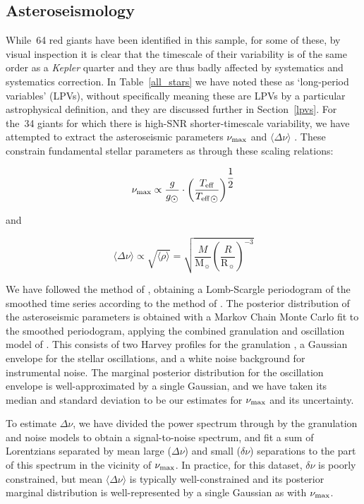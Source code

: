 \documentclass[a4paper,fleqn,usenatbib]{mnras}
\newcommand{\numax}{\mbox{$\nu_{\rm max}$}\xspace}
\newcommand{\Dnu}{\mbox{$\Delta \nu$}\xspace}
\newcommand{\dnu}{\mbox{$\delta \nu$}\xspace}
\newcommand{\teff}{\mbox{$T_{\rm eff}$}\xspace}
\newcommand{\msun}{\mbox{$\mathrm{M}_{\sun}$}\xspace}
\newcommand{\rsun}{\mbox{$\mathrm{R}_{\sun}$}\xspace}
\newcommand{\kepler}{\emph{Kepler}\xspace}
\begin{document}



\subsection{Asteroseismology}
\label{asteroseismology}

While~64 red giants have been identified in this sample, for some of these, by visual inspection it is clear that the timescale of their variability is of the same order as a \kepler quarter and they are thus badly affected by systematics and systematics correction. In Table~\ref{all_stars} we have noted these as `long-period variables' (LPVs), without specifically meaning these are LPVs by a particular astrophysical definition, and they are discussed further in Section~\ref{lpvs}. For the~34 giants for which there is high-SNR shorter-timescale variability, we have attempted to extract the asteroseismic parameters \numax and $\langle \Dnu \rangle$ \citep{KB95,2013ARA&A..51..353C}. These constrain fundamental stellar parameters as through these scaling relations: 

\begin{equation}
\label{scaling}
\numax \propto \dfrac{g}{g_{\sun}} \cdot \left(\dfrac{\teff}{\teff_{\sun}}\right)^{\dfrac{1}{2}}
\end{equation}

and

\begin{equation}
\langle \Dnu \rangle \propto \sqrt{\langle \rho \rangle} = \sqrt{\dfrac{M}{\msun} \left(\dfrac{R}{\rsun}\right)^{-3}}
\end{equation}

We have followed the method of \citet{2016AN....337..774D}, obtaining a Lomb-Scargle periodogram of the smoothed time series according to the method of \citet{2011MNRAS.414L...6G}. The posterior distribution of the asteroseismic parameters is obtained with a Markov Chain Monte Carlo fit to the smoothed periodogram, applying the combined granulation and oscillation model of \citet{2014A&A...570A..41K}. This consists of two Harvey profiles for the granulation \citep{1985ESASP.235..199H}, a Gaussian envelope for the stellar oscillations, and a white noise background for instrumental noise. The marginal posterior distribution for the oscillation envelope is well-approximated by a single Gaussian, and we have taken its median and standard deviation to be our estimates for \numax and its uncertainty.

To estimate \Dnu, we have divided the power spectrum through by the granulation and noise models to obtain a signal-to-noise spectrum, and fit a sum of Lorentzians separated by mean large (\Dnu) and small (\dnu) separations to the part of this spectrum in the vicinity of \numax. In practice, for this dataset, \dnu is poorly constrained, but mean $\langle \Dnu \rangle$ is typically well-constrained and its posterior marginal distribution is well-represented by a single Gaussian as with \numax. 
\end{document}
